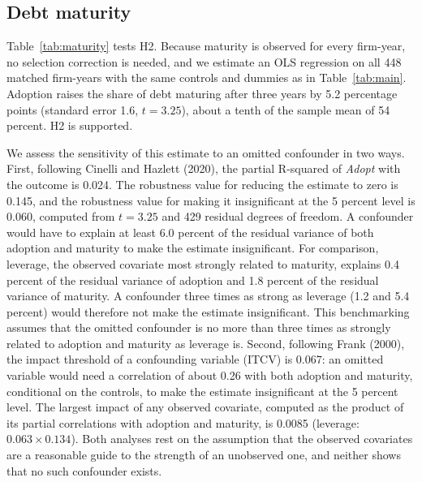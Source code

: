 \documentclass[11pt]{article}
\begin{document}
\subsection{Debt maturity}

Table~\ref{tab:maturity} tests H2. Because maturity is observed for every firm-year, no selection correction is needed, and we estimate an OLS regression on all 448 matched firm-years with the same controls and dummies as in Table~\ref{tab:main}. Adoption raises the share of debt maturing after three years by 5.2 percentage points (standard error 1.6, $t = 3.25$), about a tenth of the sample mean of 54 percent. H2 is supported.

We assess the sensitivity of this estimate to an omitted confounder in two ways. First, following Cinelli and Hazlett (2020), the partial R-squared of \textit{Adopt} with the outcome is 0.024. The robustness value for reducing the estimate to zero is 0.145, and the robustness value for making it insignificant at the 5 percent level is 0.060, computed from $t = 3.25$ and 429 residual degrees of freedom. A confounder would have to explain at least 6.0 percent of the residual variance of both adoption and maturity to make the estimate insignificant. For comparison, leverage, the observed covariate most strongly related to maturity, explains 0.4 percent of the residual variance of adoption and 1.8 percent of the residual variance of maturity. A confounder three times as strong as leverage (1.2 and 5.4 percent) would therefore not make the estimate insignificant. This benchmarking assumes that the omitted confounder is no more than three times as strongly related to adoption and maturity as leverage is. Second, following Frank (2000), the impact threshold of a confounding variable (ITCV) is 0.067: an omitted variable would need a correlation of about 0.26 with both adoption and maturity, conditional on the controls, to make the estimate insignificant at the 5 percent level. The largest impact of any observed covariate, computed as the product of its partial correlations with adoption and maturity, is 0.0085 (leverage: $0.063 \times 0.134$). Both analyses rest on the assumption that the observed covariates are a reasonable guide to the strength of an unobserved one, and neither shows that no such confounder exists.
\end{document}

